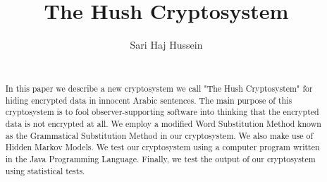 \documentclass{acm_proc_article-sp}
\begin{document}
\title{The Hush Cryptosystem}


\author{
\alignauthor Sari Haj Hussein\\
       \\
}

\maketitle

\begin{abstract}
In this paper we describe a new cryptosystem we call "The Hush Cryptosystem" for hiding encrypted data in innocent Arabic sentences. The main purpose of this cryptosystem is to fool observer-supporting software into thinking that the encrypted data is not encrypted at all. We employ a modified Word Substitution Method known as the Grammatical Substitution Method in our cryptosystem. We also make use of Hidden Markov Models. We test our cryptosystem using a computer program written in the Java Programming Language. Finally, we test the output of our cryptosystem using statistical tests.
\end{abstract}



\end{document}
